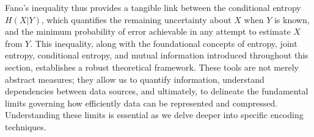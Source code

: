 \noindent Fano's inequality thus provides a tangible link between the conditional entropy $H(X|Y)$, which quantifies the remaining uncertainty about $X$ when $Y$ is known, and the minimum probability of error achievable in any attempt to estimate $X$ from $Y$. This inequality, along with the foundational concepts of entropy, joint entropy, conditional entropy, and mutual information introduced throughout this section, establishes a robust theoretical framework. These tools are not merely abstract measures; they allow us to quantify information, understand dependencies between data sources, and ultimately, to delineate the fundamental limits governing how efficiently data can be represented and compressed. Understanding these limits is essential as we delve deeper into specific encoding techniques.
\clearpage
